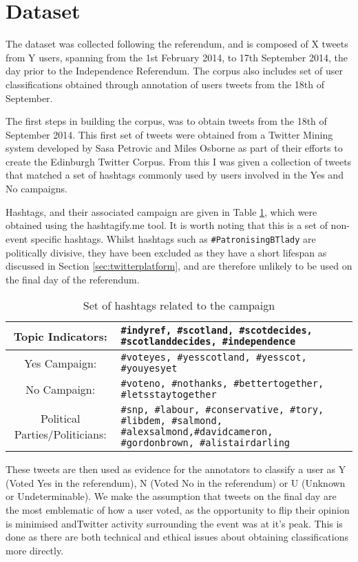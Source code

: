 \documentclass[bsc,frontabs,singlespacing,parskip]{infthesis}     %
\begin{document}
\section{Dataset}

The dataset was collected following the referendum, and is composed of X tweets from Y users, spanning from the 1st February 2014, to 17th September 2014,  the day prior to the Independence Referendum. The corpus also includes set of user classifications obtained through annotation of  users tweets from the 18th of September.

The first steps in building the corpus, was to obtain tweets from the 18th of September 2014. This first set of tweets were obtained from a Twitter Mining system developed by Sasa Petrovic and Miles Osborne as part of their efforts to create the Edinburgh Twitter Corpus. From this I  was given a collection of tweets that matched a set of hashtags commonly used by users involved in the Yes and No campaigns. 

Hashtags, and their associated campaign are given in Table \ref{tab:hashtagtable}, which were obtained using the hashtagify.me tool. It is worth noting that this is a set of non-event specific hashtags. Whilst hashtags such as \texttt{\#PatronisingBTlady}\cite{patronisingbtlady} are politically divisive, they have been excluded as they have a short lifespan as discussed in Section \ref{sec:twitterplatform}, and are therefore unlikely to be used on the final day of the referendum. 

\begin{table}
\begin{center}
    \begin{tabular}{ c p{7cm} }
    \hline
    Topic Indicators: & \tt{\#indyref, \#scotland, \#scotdecides, \#scotlanddecides, \#independence} \\ \hline	
     Yes Campaign: & \tt{\#voteyes, \#yesscotland, \#yesscot, \#youyesyet}\\ \hline
     No Campaign: & \tt{\#voteno, \#nothanks, \#bettertogether, \#letsstaytogether} \\ \hline
    Political Parties/Politicians: & \texttt{\#snp, \#labour, \#conservative, \#tory, \#libdem, \#salmond, \#alexsalmond,\#davidcameron, \#gordonbrown, \#alistairdarling}\\
	\hline
   \end{tabular}
\caption{Set of hashtags related to the campaign}
  \label{tab:hashtagtable}
\end{center}
\end{table}
These tweets are then used as evidence for the annotators to classify a user as Y (Voted Yes in the referendum), N (Voted No in the referendum) or U (Unknown or Undeterminable). We make the assumption that tweets on the final day are the most emblematic of how a user voted, as the opportunity to flip their opinion is minimised andTwitter activity surrounding the event was at it's peak. This is done as there are both technical and ethical issues about obtaining classifications more directly.
\end{document}
